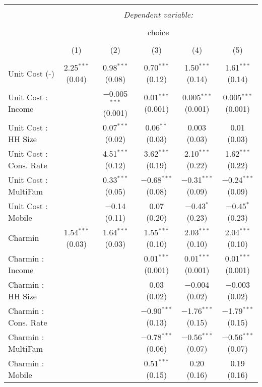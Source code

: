 
\begin{table}[!htbp] \centering 
  \caption{} 
  \label{tab:mnlLos AngelesObsHet} 
\begin{tabular}{@{\extracolsep{5pt}}lccccc} 
\\[-1.8ex]\hline 
\hline \\[-1.8ex] 
 & \multicolumn{5}{c}{\textit{Dependent variable:}} \\ 
\cline{2-6} 
\\[-1.8ex] & \multicolumn{5}{c}{choice} \\ 
\\[-1.8ex] & (1) & (2) & (3) & (4) & (5)\\ 
\hline \\[-1.8ex] 
 Unit Cost (-) & 2.25$^{***}$ (0.04) & 0.98$^{***}$ (0.08) & 0.70$^{***}$ (0.12) & 1.50$^{***}$ (0.14) & 1.61$^{***}$ (0.14) \\ 
  Unit Cost : Income &  & $-$0.005$^{***}$ (0.001) & 0.01$^{***}$ (0.001) & 0.005$^{***}$ (0.001) & 0.005$^{***}$ (0.001) \\ 
  Unit Cost : HH Size &  & 0.07$^{***}$ (0.02) & 0.06$^{**}$ (0.03) & 0.003 (0.03) & 0.01 (0.03) \\ 
  Unit Cost : Cons. Rate &  & 4.51$^{***}$ (0.12) & 3.62$^{***}$ (0.19) & 2.10$^{***}$ (0.22) & 1.62$^{***}$ (0.22) \\ 
  Unit Cost : MultiFam &  & 0.33$^{***}$ (0.05) & $-$0.68$^{***}$ (0.08) & $-$0.31$^{***}$ (0.09) & $-$0.24$^{***}$ (0.09) \\ 
  Unit Cost : Mobile &  & $-$0.14 (0.11) & 0.07 (0.20) & $-$0.43$^{*}$ (0.23) & $-$0.45$^{*}$ (0.23) \\ 
  Charmin & 1.54$^{***}$ (0.03) & 1.64$^{***}$ (0.03) & 1.55$^{***}$ (0.10) & 2.03$^{***}$ (0.10) & 2.04$^{***}$ (0.10) \\ 
  Charmin : Income &  &  & 0.01$^{***}$ (0.001) & 0.01$^{***}$ (0.001) & 0.01$^{***}$ (0.001) \\ 
  Charmin : HH Size &  &  & 0.03 (0.02) & $-$0.004 (0.02) & $-$0.003 (0.02) \\ 
  Charmin : Cons. Rate &  &  & $-$0.90$^{***}$ (0.13) & $-$1.76$^{***}$ (0.15) & $-$1.79$^{***}$ (0.15) \\ 
  Charmin : MultiFam &  &  & $-$0.78$^{***}$ (0.06) & $-$0.56$^{***}$ (0.07) & $-$0.56$^{***}$ (0.07) \\ 
  Charmin : Mobile &  &  & 0.51$^{***}$ (0.15) & 0.20 (0.16) & 0.19 (0.16) \\ 

\end{tabular}
\end{table}
